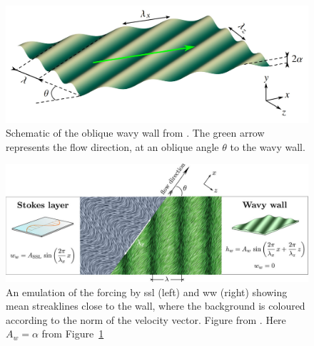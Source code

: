 \begin{figure}[htbp]
	\centering
	\includegraphics[width=0.7\linewidth]{introduction/fig/ww.jpg}
	\caption[Schematic of the oblique wavy wall]{Schematic of the oblique wavy wall from \cite{ghebali2018}. The green arrow represents the flow direction, at an oblique angle $\theta$ to the wavy wall.}
	\label{fig:ww}
\end{figure}
\begin{figure}[htbp]
	\centering
	\includegraphics[width=0.9\linewidth]{introduction/fig/wwssl.jpeg}
	\caption[Comparison of mean streaklines close to the wall between SSL and WW]{An emulation of the forcing by \gls*{ssl} (left) and \gls*{ww} (right) showing mean streaklines close to the wall, where the background is coloured according to the norm of the velocity vector. Figure from \sgc. Here $A_w=\alpha$ from Figure~\ref{fig:ww}}
	\label{fig:sslwwcomparison}
\end{figure}


